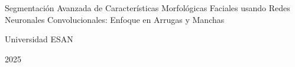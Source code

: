 \begin{center}
	{Segmentación Avanzada de Características Morfológicas Faciales usando Redes Neuronales Convolucionales: Enfoque en Arrugas y Manchas}
\end{center}

\leftline{-------------}
\vspace{3cm}

\rightline{\fillin[9cm]}
\vspace{3cm}

\rightline{\fillin[9cm]}
\vspace{3cm}


\centerline{Universidad ESAN}
\centerline{2025}